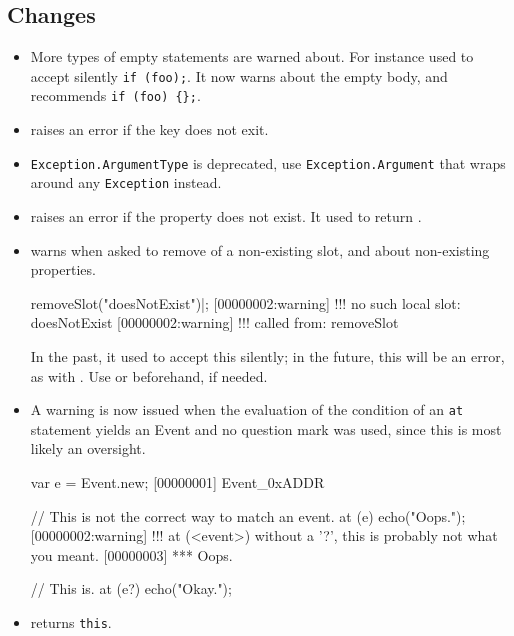 \subsection{Changes}
\begin{itemize}
\item More types of empty statements are warned about.  For instance \urbi
  used to accept silently \lstinline|if (foo);|.  It now warns about the empty
  body, and recommends \lstinline|if (foo) {};|.

\item {} raises an error if the key does not exit.

\item \lstinline|Exception.ArgumentType| is deprecated, use
  \lstinline|Exception.Argument| that wraps around any \lstinline|Exception|
  instead.

\item {} raises an error if the property does not
  exist.  It used to return .

\item {} warns when asked to remove of a
  non-existing slot, and  about non-existing
  properties.
\begin{urbiscript}
removeSlot("doesNotExist")|;
[00000002:warning] !!! no such local slot: doesNotExist
[00000002:warning] !!!    called from: removeSlot
\end{urbiscript}
  In the past, it used to accept this silently; in the future, this will be
  an error, as with .  Use
   or 
  beforehand, if needed.

\item A warning is now issued when the evaluation of the condition of an
  \lstinline|at| statement yields an Event and no question mark was used,
  since this is most likely an oversight.

\begin{urbiunchecked}
var e = Event.new;
[00000001] Event_0xADDR

// This is not the correct way to match an event.
at (e) echo("Oops.");
[00000002:warning] !!! at (<event>) without a '?', this is probably not what you meant.
[00000003] *** Oops.

// This is.
at (e?) echo("Okay.");
\end{urbiunchecked}

\item {} returns \lstinline|this|.
\end{itemize}


